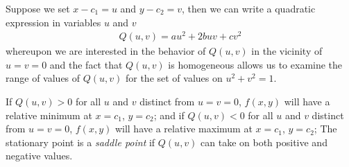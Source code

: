  Suppose we set $x-c_1 = u$ and $y - c_2 = v$, then we can write a quadratic expression in variables $u$ and $v$ \ie 
 \begin{align}
	Q(u,v) = au^2 + 2buv + cv^2
 \end{align}
 whereupon we are interested in the behavior of $Q(u,v)$ in the vicinity of $u=v=0$ and the fact that $Q(u,v)$ is homogeneous allows us to examine the range of values of $Q(u,v)$ for the set of values on $u^2 + v^2 = 1$. 
 
 If $Q(u,v) > 0$ for all $u$ and $v$ distinct from $u=v=0$, $f(x,y)$ will have a relative minimum at $x = c_1$, $y=c_2$; and if $Q(u,v) < 0$ for all $u$ and $v$ distinct from $u=v=0$, $f(x,y)$ will have a relative maximum at $x = c_1$, $y=c_2$; The stationary point is a \textit{saddle point} if $Q(u,v)$ can take on both positive and negative values.